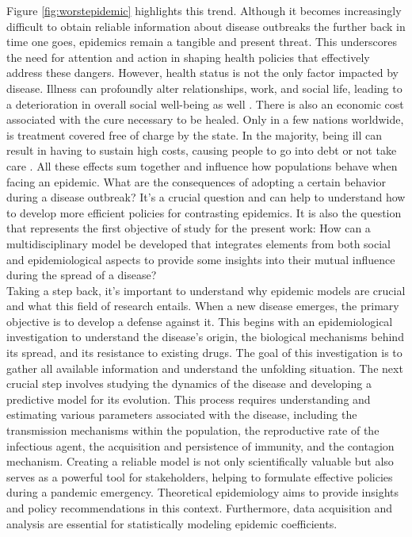 Figure \ref{fig:worstepidemic} highlights this trend. Although it becomes increasingly difficult to obtain reliable information about disease outbreaks the further back in time one goes, epidemics remain a tangible and present threat. This underscores the need for attention and action in shaping health policies that effectively address these dangers.
However, health status is not the only factor impacted by disease. Illness can profoundly alter relationships, work, and social life, leading to a deterioration in overall social well-being as well \cite{Yang_2020}. 
There is also an economic cost associated with the cure necessary to be healed. Only in a few nations worldwide, is treatment covered free of charge by the state. In the majority, being ill can result in having to sustain high costs, causing people to go into debt or not take care \cite{esteban_2017, Barlow2021}. 
All these effects sum together and influence how populations behave when facing an epidemic. What are the consequences of adopting a certain behavior during a disease outbreak? It's a crucial question and can help to understand how to develop more efficient policies for contrasting epidemics. It is also the question that represents the first objective of study for the present work: How can a multidisciplinary model be developed that integrates elements from both social and epidemiological aspects to provide some insights into their mutual influence during the spread of a disease?
\\
\newline
Taking a step back, it's important to understand why epidemic models are crucial and what this field of research entails.
When a new disease emerges, the primary objective is to develop a defense against it. This begins with an epidemiological investigation to understand the disease's origin, the biological mechanisms behind its spread, and its resistance to existing drugs. The goal of this investigation is to gather all available information and understand the unfolding situation.
The next crucial step involves studying the dynamics of the disease and developing a predictive model for its evolution. This process requires understanding and estimating various parameters associated with the disease, including the transmission mechanisms within the population, the reproductive rate of the infectious agent, the acquisition and persistence of immunity, and the contagion mechanism.
Creating a reliable model is not only scientifically valuable but also serves as a powerful tool for stakeholders, helping to formulate effective policies during a pandemic emergency. Theoretical epidemiology aims to provide insights and policy recommendations in this context. Furthermore, data acquisition and analysis are essential for statistically modeling epidemic coefficients. 

